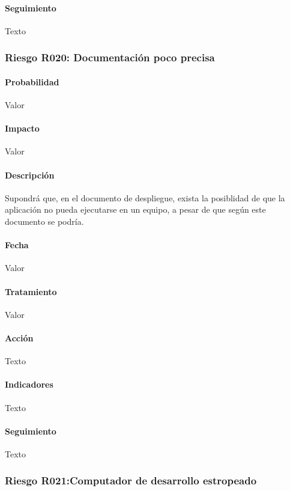 \documentclass[10pt,a4paper]{article}
\begin{document}
				\paragraph{Seguimiento}	Texto %
				\subsubsection{Riesgo R020: Documentación poco precisa }
				\paragraph{Probabilidad} Valor
				\paragraph{Impacto}	Valor
				\paragraph{Descripción} Supondrá que, en el documento de despliegue, exista la posiblidad de que la aplicación no pueda ejecutarse en un equipo, a pesar de que según este documento se podría.

				\paragraph{Fecha} Valor %
				\paragraph{Tratamiento} Valor %
				\paragraph{Acción} Texto %
				\paragraph{Indicadores} Texto %
				\paragraph{Seguimiento}	Texto %
				
				\subsubsection{Riesgo R021:Computador de desarrollo estropeado }
\end{document}
